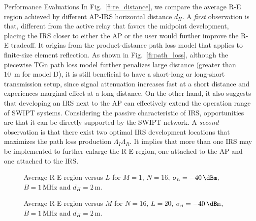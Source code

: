 \documentclass[journal]{IEEEtran}
\begin{document}
\begin{section}{Performance Evaluations}
		In Fig.~\ref{fi:re_distance}, we compare the average R-E region achieved by different AP-IRS horizontal distance $d_H$. A \textit{first} observation is that, different from the active relay that favors the midpoint development, placing the IRS closer to either the AP or the user would further improve the R-E tradeoff. It origins from the product-distance path loss model that applies to finite-size element reflection. As shown in Fig.~\ref{fi:path_loss}, although the piecewise TGn path loss model further penalizes large distance (greater than \SI{10}{\meter} for model D), it is still beneficial to have a short-long or long-short transmission setup, since signal attenuation increases fast at a short distance and experiences marginal effect at a long distance. On the other hand, it also suggests that developing an IRS next to the AP can effectively extend the operation range of SWIPT systems. Considering the passive characteristic of IRS, opportunities are that it can be directly supported by the SWIPT network. A \textit{second} observation is that there exist two optimal IRS development locations that maximizes the path loss production $\Lambda_I\Lambda_R$. It implies that more than one IRS may be implemented to further enlarge the R-E region, one attached to the AP and one attached to the IRS.

		\begin{figure}[!t]
			\centering
			\begin{adjustbox}{width=\linewidth}
				
			\end{adjustbox}
			\caption{Average R-E region versus $L$ for $M=1$, $N=16$, $\sigma_n=-40\,\si{\dBm}$, $B=1\,\si{\MHz}$ and $d_H=2\,\si{\meter}$.}
			\label{fi:re_reflector}
		\end{figure}

		\begin{figure}[!t]
			\centering
			\begin{adjustbox}{width=\linewidth}
				
			\end{adjustbox}
			\caption{Average R-E region versus $M$ for $N=16$, $L=20$, $\sigma_n=-40\,\si{\dBm}$, $B=1\,\si{\MHz}$ and $d_H=2\,\si{\meter}$.}
			\label{fi:re_tx}
		\end{figure}


\end{section}
\end{document}
